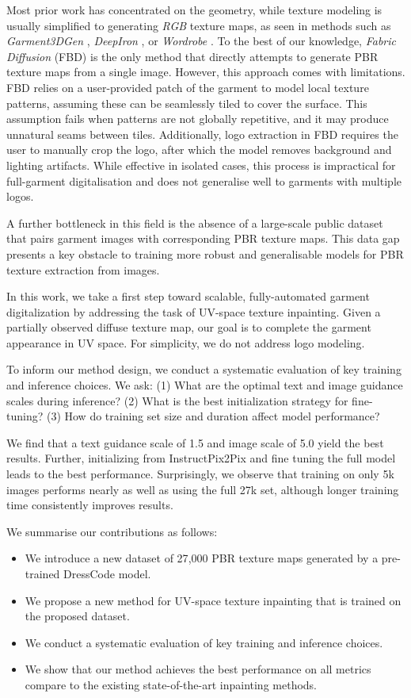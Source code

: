\documentclass[11pt,twocolumn]{article}
\begin{document}
Most prior work has concentrated on the geometry, while texture modeling is usually simplified to generating \textit{RGB} 
texture maps, as seen in methods such as \textit{Garment3DGen} \cite{garment3dgen}, \textit{DeepIron} \cite{deepiron}, 
or \textit{Wordrobe} \cite{WordRobe}. To the best of our knowledge, \textit{Fabric Diffusion} (FBD) \cite{fabricdiffusion} is 
the only method that directly attempts to generate PBR texture maps from a single image. 
However, this approach comes with limitations. FBD relies on a user-provided patch of the garment to model local 
texture patterns, assuming these can be seamlessly tiled to cover the surface. This assumption fails when patterns are not 
globally repetitive, and it may produce unnatural seams between tiles. 
Additionally, logo extraction in FBD requires the user to manually crop the logo, 
after which the model removes background and lighting artifacts. 
While effective in isolated cases, this process is impractical for full-garment digitalisation and does not 
generalise well to garments with multiple logos.

A further bottleneck in this field is the absence of a large-scale public dataset that pairs 
garment images with corresponding PBR texture maps. This data gap presents a key obstacle to 
training more robust and generalisable models for PBR texture extraction from images.

In this work, we take a first step toward scalable, fully-automated garment digitalization by addressing the 
task of UV-space texture inpainting. Given a partially observed diffuse texture map, our goal is to complete 
the garment appearance in UV space. For simplicity, we do not address logo modeling.

To inform our method design, we conduct a systematic evaluation of key training and inference choices. 
We ask: (1) What are the optimal text and image guidance scales during inference? (2) What is the best initialization strategy for fine-tuning? (3) 
How do training set size and duration affect model performance?

We find that a text guidance scale of 1.5 and image scale of 5.0 yield the best results. 
Further, initializing from InstructPix2Pix and fine tuning the full model leads to the best performance. 
Surprisingly, we observe that training on only 5k images performs nearly as well as using the full 27k set, 
although longer training time consistently improves results.

We summarise our contributions as follows:
\begin{itemize}[itemsep=2pt, topsep=2pt]
  \item We introduce a new dataset of 27{,}000 PBR texture maps generated by a pre-trained DressCode \cite{dresscode} model.
  \item We propose a new method for UV-space texture inpainting that is trained on the proposed dataset.
  \item We conduct a systematic evaluation of key training and inference choices.
  \item We show that our method achieves the best performance on all metrics compare to the existing state-of-the-art inpainting methods.
\end{itemize}
\end{document}
